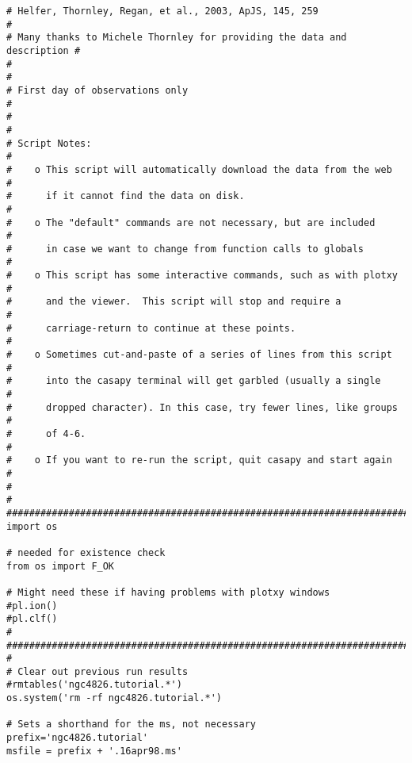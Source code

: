 \begin{verbatim}
# Helfer, Thornley, Regan, et al., 2003, ApJS, 145, 259                  #
# Many thanks to Michele Thornley for providing the data and description #
#                                                                        #
# First day of observations only                                         #
#                                                                        #
# Script Notes:                                                          #
#    o This script will automatically download the data from the web     #
#      if it cannot find the data on disk.                               #
#    o The "default" commands are not necessary, but are included        #
#      in case we want to change from function calls to globals          #
#    o This script has some interactive commands, such as with plotxy    #
#      and the viewer.  This script will stop and require a              #
#      carriage-return to continue at these points.                      #
#    o Sometimes cut-and-paste of a series of lines from this script     #
#      into the casapy terminal will get garbled (usually a single       #
#      dropped character). In this case, try fewer lines, like groups    #
#      of 4-6.                                                           #
#    o If you want to re-run the script, quit casapy and start again     #
#                                                                        #
##########################################################################
import os

# needed for existence check
from os import F_OK

# Might need these if having problems with plotxy windows
#pl.ion()
#pl.clf()
#
##########################################################################
#                                                                        
# Clear out previous run results
#rmtables('ngc4826.tutorial.*')
os.system('rm -rf ngc4826.tutorial.*')

# Sets a shorthand for the ms, not necessary
prefix='ngc4826.tutorial'
msfile = prefix + '.16apr98.ms'


\end{verbatim}
